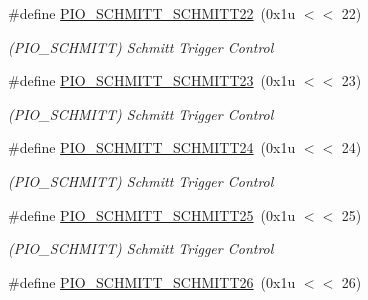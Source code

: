\begin{DoxyCompactItemize}
\mbox{\label{group__SAMV71__PIO_ga99286856509c81e95e5c8aa67da05a90}} 
\#define \mbox{\hyperlink{group__SAMV71__PIO_ga99286856509c81e95e5c8aa67da05a90}{P\+I\+O\+\_\+\+S\+C\+H\+M\+I\+T\+T\+\_\+\+S\+C\+H\+M\+I\+T\+T22}}~(0x1u $<$$<$ 22)
\begin{DoxyCompactList}\small\item\em (P\+I\+O\+\_\+\+S\+C\+H\+M\+I\+TT) Schmitt Trigger Control \end{DoxyCompactList}\item 
\mbox{\label{group__SAMV71__PIO_ga3ab1c99271fd2a45cec6273b82aa5f95}} 
\#define \mbox{\hyperlink{group__SAMV71__PIO_ga3ab1c99271fd2a45cec6273b82aa5f95}{P\+I\+O\+\_\+\+S\+C\+H\+M\+I\+T\+T\+\_\+\+S\+C\+H\+M\+I\+T\+T23}}~(0x1u $<$$<$ 23)
\begin{DoxyCompactList}\small\item\em (P\+I\+O\+\_\+\+S\+C\+H\+M\+I\+TT) Schmitt Trigger Control \end{DoxyCompactList}\item 
\mbox{\label{group__SAMV71__PIO_ga317c9d464daf0b5d9824de46a3fa4ccf}} 
\#define \mbox{\hyperlink{group__SAMV71__PIO_ga317c9d464daf0b5d9824de46a3fa4ccf}{P\+I\+O\+\_\+\+S\+C\+H\+M\+I\+T\+T\+\_\+\+S\+C\+H\+M\+I\+T\+T24}}~(0x1u $<$$<$ 24)
\begin{DoxyCompactList}\small\item\em (P\+I\+O\+\_\+\+S\+C\+H\+M\+I\+TT) Schmitt Trigger Control \end{DoxyCompactList}\item 
\mbox{\label{group__SAMV71__PIO_ga2892b01219795e6620c7111d0db75a6d}} 
\#define \mbox{\hyperlink{group__SAMV71__PIO_ga2892b01219795e6620c7111d0db75a6d}{P\+I\+O\+\_\+\+S\+C\+H\+M\+I\+T\+T\+\_\+\+S\+C\+H\+M\+I\+T\+T25}}~(0x1u $<$$<$ 25)
\begin{DoxyCompactList}\small\item\em (P\+I\+O\+\_\+\+S\+C\+H\+M\+I\+TT) Schmitt Trigger Control \end{DoxyCompactList}\item 
\mbox{\label{group__SAMV71__PIO_gad7e0e4914fa8ce1894da65df2a3864c6}} 
\#define \mbox{\hyperlink{group__SAMV71__PIO_gad7e0e4914fa8ce1894da65df2a3864c6}{P\+I\+O\+\_\+\+S\+C\+H\+M\+I\+T\+T\+\_\+\+S\+C\+H\+M\+I\+T\+T26}}~(0x1u $<$$<$ 26)
$$
\end{DoxyCompactItemize}
